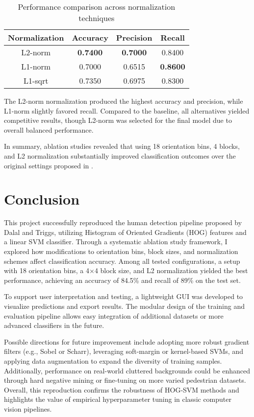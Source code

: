 \documentclass[10pt, onecolumn, a4paper]{article}
\begin{document}
\begin{table}[H]
\centering
\caption{\small Performance comparison across normalization techniques}
\begin{tabular}{|c|c|c|c|}
\hline
\textbf{Normalization} & \textbf{Accuracy} & \textbf{Precision} & \textbf{Recall} \\
\hline
L2-norm & \textbf{0.7400} & \textbf{0.7000} & 0.8400 \\
L1-norm & 0.7000 & 0.6515 & \textbf{0.8600} \\
L1-sqrt & 0.7350 & 0.6975 & 0.8300 \\
\hline
\end{tabular}
\label{tab:norm_ablation}
\end{table}

The L2-norm normalization produced the highest accuracy and precision, while L1-norm slightly favored recall. Compared to the baseline, 
all alternatives yielded competitive results, though L2-norm was selected for the final model due to overall balanced performance.

\vspace{0.5em}
In summary, ablation studies revealed that using 18 orientation bins, 4 blocks, 
and L2 normalization substantially improved classification outcomes over the original settings proposed in \cite{1467360}.

\vspace{0.5em}
\section{Conclusion}
\vspace{0.5em}

This project successfully reproduced the human detection pipeline proposed by Dalal and Triggs, utilizing Histogram of Oriented Gradients (HOG) features and a linear SVM classifier. 
Through a systematic ablation study framework, I explored how modifications to orientation bins, block sizes, and normalization schemes affect classification accuracy. 
Among all tested configurations, a setup with 18 orientation bins, a 4$\times$4 block size, and L2 normalization yielded the best performance, achieving an accuracy of 84.5\% and recall of 89\% on the test set.

To support user interpretation and testing, a lightweight GUI was developed to visualize predictions and export results. 
The modular design of the training and evaluation pipeline allows easy integration of additional datasets or more advanced classifiers in the future.

Possible directions for future improvement include adopting more robust gradient filters (e.g., Sobel or Scharr), leveraging soft-margin or kernel-based SVMs, 
and applying data augmentation to expand the diversity of training samples. 
Additionally, performance on real-world cluttered backgrounds could be enhanced through hard negative mining or fine-tuning on more varied pedestrian datasets. 
Overall, this reproduction confirms the robustness of HOG-SVM methods and highlights the value of empirical hyperparameter tuning in classic computer vision pipelines.

\newpage


\end{document}
